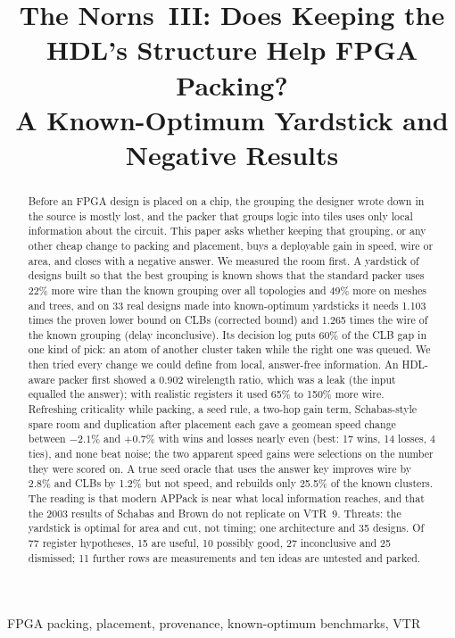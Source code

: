 \documentclass[conference]{IEEEtran}
\title{The Norns~III: Does Keeping the HDL's Structure Help FPGA Packing?\\
A Known-Optimum Yardstick and Negative Results}
\author{\IEEEauthorblockN{Peter Jamieson}
\IEEEauthorblockA{Electrical and Computer Engineering, Miami University\\
Oxford, OH, USA\\
jamiespa@miamioh.edu}}
\begin{document}
\maketitle

\begin{abstract}
Before an FPGA design is placed on a chip, the grouping the designer wrote down in the source is mostly lost, and the packer that groups logic into tiles uses only local information about the circuit. This paper asks whether keeping that grouping, or any other cheap change to packing and placement, buys a deployable gain in speed, wire or area, and closes with a negative answer. We measured the room first. A yardstick of designs built so that the best grouping is known shows that the standard packer uses 22\% more wire than the known grouping over all topologies and 49\% more on meshes and trees, and on 33 real designs made into known-optimum yardsticks it needs 1.103 times the proven lower bound on CLBs (corrected bound) and 1.265 times the wire of the known grouping (delay inconclusive). Its decision log puts 60\% of the CLB gap in one kind of pick: an atom of another cluster taken while the right one was queued. We then tried every change we could define from local, answer-free information. An HDL-aware packer first showed a 0.902 wirelength ratio, which was a leak (the input equalled the answer); with realistic registers it used 65\% to 150\% more wire. Refreshing criticality while packing, a seed rule, a two-hop gain term, Schabas-style spare room and duplication after placement each gave a geomean speed change between $-2.1\%$ and $+0.7\%$ with wins and losses nearly even (best: 17 wins, 14 losses, 4 ties), and none beat noise; the two apparent speed gains were selections on the number they were scored on. A true seed oracle that uses the answer key improves wire by 2.8\% and CLBs by 1.2\% but not speed, and rebuilds only 25.5\% of the known clusters. The reading is that modern APPack is near what local information reaches, and that the 2003 results of Schabas and Brown do not replicate on VTR~9. Threats: the yardstick is optimal for area and cut, not timing; one architecture and 35 designs. Of 77 register hypotheses, 15 are useful, 10 possibly good, 27 inconclusive and 25 dismissed; 11 further rows are measurements and ten ideas are untested and parked.
\end{abstract}

\begin{IEEEkeywords}
FPGA packing, placement, provenance, known-optimum benchmarks, VTR
\end{IEEEkeywords}



















\end{document}
